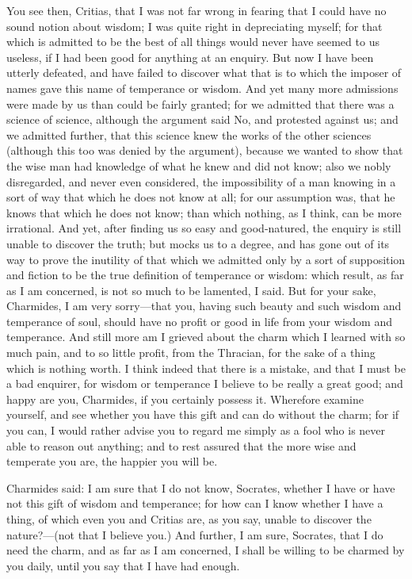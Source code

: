\documentclass[11pt,letter]{article}
\begin{document}
\par  You see then, Critias, that I was not far wrong in fearing that I could have no sound notion about wisdom; I was quite right in depreciating myself; for that which is admitted to be the best of all things would never have seemed to us useless, if I had been good for anything at an enquiry. But now I have been utterly defeated, and have failed to discover what that is to which the imposer of names gave this name of temperance or wisdom. And yet many more admissions were made by us than could be fairly granted; for we admitted that there was a science of science, although the argument said No, and protested against us; and we admitted further, that this science knew the works of the other sciences (although this too was denied by the argument), because we wanted to show that the wise man had knowledge of what he knew and did not know; also we nobly disregarded, and never even considered, the impossibility of a man knowing in a sort of way that which he does not know at all; for our assumption was, that he knows that which he does not know; than which nothing, as I think, can be more irrational. And yet, after finding us so easy and good-natured, the enquiry is still unable to discover the truth; but mocks us to a degree, and has gone out of its way to prove the inutility of that which we admitted only by a sort of supposition and fiction to be the true definition of temperance or wisdom: which result, as far as I am concerned, is not so much to be lamented, I said. But for your sake, Charmides, I am very sorry—that you, having such beauty and such wisdom and temperance of soul, should have no profit or good in life from your wisdom and temperance. And still more am I grieved about the charm which I learned with so much pain, and to so little profit, from the Thracian, for the sake of a thing which is nothing worth. I think indeed that there is a mistake, and that I must be a bad enquirer, for wisdom or temperance I believe to be really a great good; and happy are you, Charmides, if you certainly possess it. Wherefore examine yourself, and see whether you have this gift and can do without the charm; for if you can, I would rather advise you to regard me simply as a fool who is never able to reason out anything; and to rest assured that the more wise and temperate you are, the happier you will be.

\par  Charmides said: I am sure that I do not know, Socrates, whether I have or have not this gift of wisdom and temperance; for how can I know whether I have a thing, of which even you and Critias are, as you say, unable to discover the nature?—(not that I believe you.) And further, I am sure, Socrates, that I do need the charm, and as far as I am concerned, I shall be willing to be charmed by you daily, until you say that I have had enough.
\end{document}

